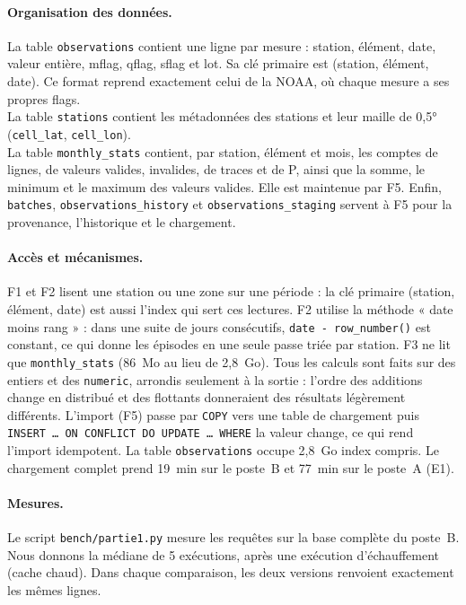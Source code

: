 \documentclass{rapportClass}
\newcommand{\cmd}[1]{\texttt{#1}}
\begin{document}
\paragraph{Organisation des données.} La table \cmd{observations} contient une ligne par mesure : station,
élément, date, valeur entière, mflag, qflag, sflag et lot. Sa clé primaire est (station, élément, date). Ce format
reprend exactement celui de la NOAA, où chaque mesure a ses propres flags.\\
La table \cmd{stations} contient les métadonnées des stations 
et leur maille de 0,5° (\cmd{cell\_lat}, \cmd{cell\_lon}).\\
La table \cmd{monthly\_stats} contient, par station, élément et mois, les comptes de
lignes, de valeurs valides, invalides, de traces et de P, ainsi que la somme, le minimum et le maximum des
valeurs valides. Elle est maintenue par F5. Enfin, \cmd{batches}, \cmd{observations\_history} et
\cmd{observations\_staging} servent à F5 pour la provenance, l'historique et le chargement.

\paragraph{Accès et mécanismes.}
F1 et F2 lisent une station ou une zone sur une période : la clé primaire (station, élément, date) est aussi
l'index qui sert ces lectures. F2 utilise la méthode « date moins rang » : dans une suite de jours consécutifs,
\cmd{date - row\_number()} est constant, ce qui donne les épisodes en une seule passe triée par station.
F3 ne lit que \cmd{monthly\_stats} (86~Mo au lieu de 2,8~Go). Tous les calculs sont faits sur des entiers et
des \cmd{numeric}, arrondis seulement à la sortie : l'ordre des additions change en distribué et des flottants
donneraient des résultats légèrement différents. L'import (F5) passe par \cmd{COPY} vers une table de chargement puis
\cmd{INSERT \ldots{} ON CONFLICT DO UPDATE \ldots{} WHERE} la valeur change, ce qui rend l'import idempotent.
La table \cmd{observations} occupe 2,8~Go index compris. Le chargement complet prend 19~min sur le poste~B
et 77~min sur le poste~A (E1).

\paragraph{Mesures.} Le script \cmd{bench/partie1.py} mesure les requêtes sur la base complète du poste~B. Nous
donnons la médiane de 5 exécutions, après une exécution d'échauffement (cache chaud). Dans chaque comparaison,
les deux versions renvoient exactement les mêmes lignes.
\end{document}

